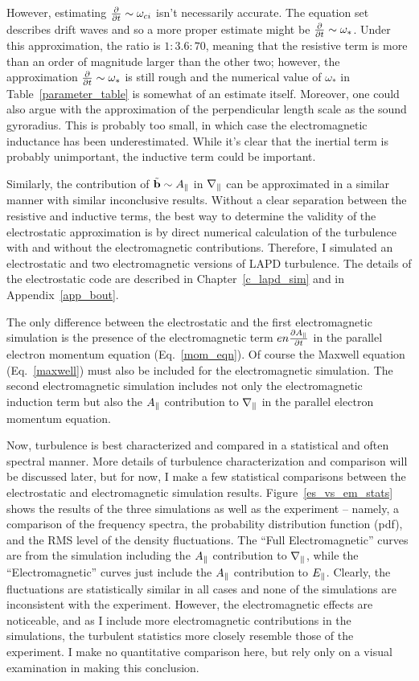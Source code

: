 However, estimating $\frac{\partial}{\partial t} \sim \omega_{ci}$ isn't necessarily accurate. The equation set describes drift waves and so a more proper estimate might be
$\frac{\partial}{\partial t} \sim \omega_{*}$. Under this approximation, the ratio is $1:3.6:70$, meaning that the resistive term is more than an order of magnitude larger than the other two; however, the 
approximation $\frac{\partial}{\partial t} \sim \omega_{*}$ is still rough and the numerical value of $\omega_{*}$ in Table~\ref{parameter_table} is somewhat of an estimate itself. 
Moreover, one could also argue with the approximation of the perpendicular length scale as the sound gyroradius. 
This is probably too small, in which case the electromagnetic inductance has been underestimated. While it's clear that
the inertial term is probably unimportant, the inductive term could be important. 

Similarly, the contribution of $\tilde{{\bf b}} \sim A_\parallel$ in $\nabla_\parallel$ can be approximated in a similar manner with similar inconclusive results. 
Without a clear separation between the resistive and inductive terms, the best way to determine the validity of
the electrostatic approximation is by direct numerical calculation of the turbulence with and without the electromagnetic contributions. 
Therefore, I simulated an electrostatic and two electromagnetic versions of LAPD turbulence. 
The details of the electrostatic code are described in Chapter~\ref{c_lapd_sim} and in Appendix~\ref{app_bout}.

The only difference between the electrostatic and the first electromagnetic simulation is the presence of the electromagnetic term $e n \frac{\partial A_\parallel}{\partial t}$ 
in the parallel electron momentum equation (Eq.~\ref{mom_eqn}). Of course the Maxwell equation
(Eq.~\ref{maxwell}) must also be included for the electromagnetic simulation. The second electromagnetic simulation includes not only the electromagnetic induction term
 but also the $A_\parallel$ contribution to $\nabla_\parallel$ in the parallel electron momentum equation.

Now, turbulence is best characterized and compared in a statistical and often spectral manner. 
More details of turbulence characterization and comparison will be discussed later, but for now, I make a few statistical comparisons between the electrostatic and electromagnetic simulation results.
Figure~\ref{es_vs_em_stats} shows the results of the three simulations as well as the experiment
 -- namely, a comparison of the frequency spectra, the probability distribution function (pdf), and the RMS level of the density fluctuations. 
The ``Full Electromagnetic'' curves are from the simulation including the $A_\parallel$ contribution to $\nabla_\parallel$, while the ``Electromagnetic'' curves
just include the $A_\parallel$ contribution to $E_\parallel$. 
Clearly, the fluctuations are statistically similar in all cases and none of the simulations are inconsistent with the experiment. 
However, the electromagnetic effects are noticeable, and as I include more electromagnetic contributions in the simulations, the turbulent statistics more closely resemble those of the experiment.
I make no quantitative comparison here, but rely only on a visual examination in making this conclusion.

